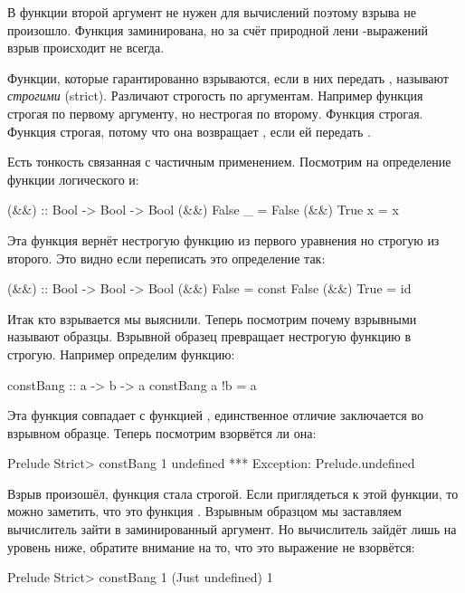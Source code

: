 В функции  второй аргумент не нужен для вычислений
поэтому взрыва не произошло.
Функция  заминирована, но за счёт природной
лени -выражений взрыв происходит не всегда. 

Функции, которые гарантированно взрываются, если 
в них передать , называют \emph{строгими} (strict).
Различают строгость по аргументам. Например функция
 строгая по первому аргументу, но нестрогая по второму.
Функция  строгая. Функция  строгая, потому что
она возвращает , если ей передать .

Есть тонкость связанная с частичным применением. Посмотрим
на определение функции логического и:

\begin{code}
(&&) :: Bool -> Bool -> Bool
(&&) False _ = False
(&&) True  x = x
\end{code}

Эта функция вернёт нестрогую функцию из первого 
уравнения но строгую из второго. Это видно если переписать 
это определение так:

\begin{code}
(&&) :: Bool -> Bool -> Bool
(&&) False = const False
(&&) True  = id
\end{code}

Итак кто взрывается мы выяснили. Теперь посмотрим почему
взрывными называют образцы. Взрывной образец превращает
нестрогую функцию в строгую. Например определим функцию:

\begin{code}
constBang :: a -> b -> a
constBang a !b = a
\end{code}

Эта функция совпадает с функцией , единственное
отличие заключается во взрывном образце. Теперь посмотрим 
взорвётся ли она:

\begin{code}
Prelude Strict> constBang 1 undefined
*** Exception: Prelude.undefined
\end{code}

Взрыв произошёл, функция стала строгой. Если приглядеться
к этой функции, то можно заметить, что это функция .
Взрывным образцом мы заставляем вычислитель зайти в заминированный
аргумент. Но вычислитель зайдёт лишь на уровень ниже, обратите
внимание на то, что это выражение не взорвётся:

\begin{code}
Prelude Strict> constBang 1 (Just undefined)
1
\end{code}


